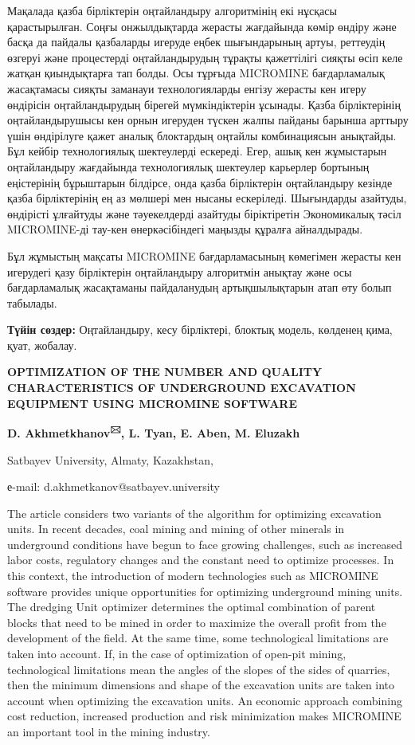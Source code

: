 Мақалада қазба бірліктерін оңтайландыру алгоритмінің екі нұсқасы
қарастырылған. Соңғы онжылдықтарда жерасты жағдайында көмір өндіру және
басқа да пайдалы қазбаларды игеруде еңбек шығындарының артуы, реттеудің
өзгеруі және процестерді оңтайландырудың тұрақты қажеттілігі сияқты өсіп
келе жатқан қиындықтарға тап болды. Осы тұрғыда MICROMINE бағдарламалық
жасақтамасы сияқты заманауи технологияларды енгізу жерасты кен игеру
өндірісін оңтайландырудың бірегей мүмкіндіктерін ұсынады. Қазба
бірліктерінің оңтайландырушысы кен орнын игеруден түскен жалпы пайданы
барынша арттыру үшін өндірілуге қажет аналық блоктардың оңтайлы
комбинациясын анықтайды. Бұл кейбір технологиялық шектеулерді ескереді.
Егер, ашық кен жұмыстарын оңтайландыру жағдайында технологиялық
шектеулер карьерлер бортының еңістерінің бұрыштарын білдірсе, онда қазба
бірліктерін оңтайландыру кезінде қазба бірліктерінің ең аз мөлшері мен
нысаны ескеріледі. Шығындарды азайтуды, өндірісті ұлғайтуды және
тәуекелдерді азайтуды біріктіретін Экономикалық тәсіл MICROMINE-ді
тау-кен өнеркәсібіндегі маңызды құралға айналдырады.

Бұл жұмыстың мақсаты MICROMINE бағдарламасының көмегімен жерасты кен
игерудегі қазу бірліктерін оңтайландыру алгоритмін анықтау және осы
бағдарламалық жасақтаманы пайдаланудың артықшылықтарын атап өту болып
табылады.

{\bfseries Түйін сөздер:} Оңтайландыру, кесу бірліктері, блоктық модель,
көлденең қима, қуат, жобалау.

\begin{center}
{\large\bfseries OPTIMIZATION OF THE NUMBER AND QUALITY CHARACTERISTICS OF
UNDERGROUND EXCAVATION EQUIPMENT USING MICROMINE SOFTWARE}

{\bfseries D. Akhmetkhanov\textsuperscript{🖂}, L. Tyan, E. Aben, M.
Eluzakh}

Satbayev University, Almaty, Kazakhstan,

е-mail: d.akhmetkanov@satbayev.university
\end{center}

The article considers two variants of the algorithm for optimizing
excavation units. In recent decades, coal mining and mining of other
minerals in underground conditions have begun to face growing
challenges, such as increased labor costs, regulatory changes and the
constant need to optimize processes. In this context, the introduction
of modern technologies such as MICROMINE software provides unique
opportunities for optimizing underground mining units. The dredging Unit
optimizer determines the optimal combination of parent blocks that need
to be mined in order to maximize the overall profit from the development
of the field. At the same time, some technological limitations are taken
into account. If, in the case of optimization of open-pit mining,
technological limitations mean the angles of the slopes of the sides of
quarries, then the minimum dimensions and shape of the excavation units
are taken into account when optimizing the excavation units. An economic
approach combining cost reduction, increased production and risk
minimization makes MICROMINE an important tool in the mining industry.

